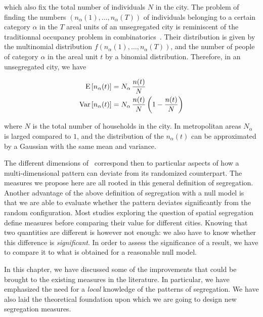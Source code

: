which also fix the total number of individuals $N$ in the city. The problem of
finding the numbers $\left( n_\alpha(1), \dots, n_\alpha(T) \right)$ of
individuals belonging to a certain category $\alpha$ in the $T$ areal units of
an unsegregated city is reminiscent of the traditionnal occupancy problem in
combinatorics~\cite{Feller:1950}. Their distribution is given by the multinomial
distribution $f \left( n_\alpha(1), \dots, n_\alpha(T) \right)$, and the number
of people of category $\alpha$ in the areal unit $t$ by a binomial distribution.
Therefore, in an unsegregated city, we have

\begin{align}
    \begin{split}
	\mathrm{E} \left[ n_\alpha(t) \right] &= N_\alpha\,\frac{n(t)}{N} \\
	\mathrm{Var} \left[ n_\alpha(t) \right] &= N_\alpha\,\frac{n(t)}{N} \left( 1 - \frac{n(t)}{N}  \right) 
    \end{split}
\end{align}

where $N$ is the total number of households in the city. In metropolitan areas
$N_\alpha$ is larged compared to $1$, and the distribution of the $n_\alpha(t)$
can be approximated by a Gaussian with the same mean and variance.

The different dimensions of~\cite{Massey:1988,Reardon:2004} correspond then to
particular aspects of how a multi-dimensional pattern can deviate from its
randomized counterpart. The measures we propose here are all rooted in this
general definition of segregation.
Another advantage of the above definition of segregation with a null model is
that we are able to evaluate whether the pattern deviates significantly from the
random configuration.
Most studies exploring the question of spatial segregation define measures
before comparing their value for different cities. Knowing that two quantities
are different is however not enough: we also have to know whether this
difference is {\em significant}. In order to assess the significance of a
result, we have to compare it to what is obtained for a reasonable null model.\\

\bigskip

In this chapter, we have discussed some of the improvements that could be
brought to the existing measures in the literature. In particular, we have
emphasized the need for a \emph{local} knowledge of the patterns of segregation.
We have also laid the theoretical foundation upon which we are going to design
new segregation measures.
